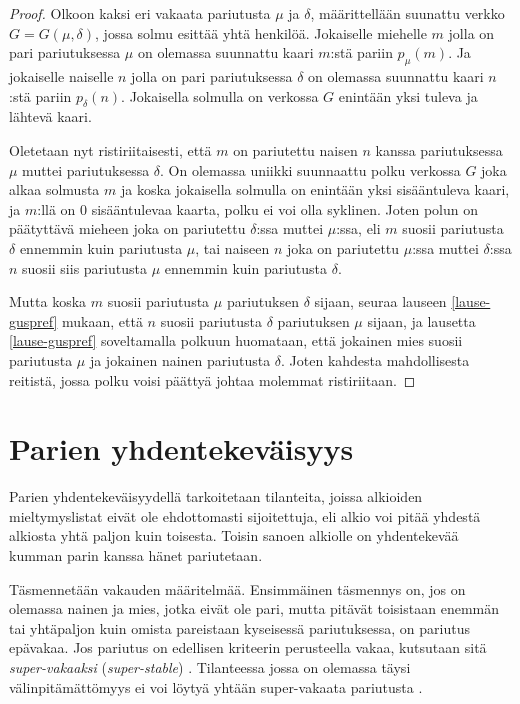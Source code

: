 \documentclass[finnish]{tktltiki2}
\theoremstyle{definition}
\theoremstyle{remark}
\begin{document}
\begin{proof}\cite[p. 27]{gusfield1989stable}
Olkoon kaksi eri vakaata pariutusta $\mu$ ja $\delta$, määrittellään suunattu verkko $G = G(\mu, \delta)$, jossa solmu esittää yhtä henkilöä. Jokaiselle miehelle $m$ jolla on pari pariutuksessa $\mu$ on olemassa suunnattu kaari $m$:stä pariin $p_{\mu}(m)$. Ja jokaiselle naiselle $n$ jolla on pari pariutuksessa $\delta$ on olemassa suunnattu kaari $n$:stä pariin $p_{\delta}(n)$.
Jokaisella solmulla on verkossa $G$ enintään yksi tuleva ja lähtevä kaari.

Oletetaan nyt ristiriitaisesti, että $m$ on pariutettu naisen $n$ kanssa pariutuksessa $\mu$ muttei pariutuksessa $\delta$. On olemassa uniikki suunnaattu polku verkossa $G$ joka alkaa solmusta $m$ ja koska jokaisella solmulla on enintään yksi sisääntuleva kaari, ja $m$:llä on 0 sisääntulevaa kaarta, polku ei voi olla syklinen. Joten polun on päätyttävä mieheen joka on pariutettu $\delta$:ssa muttei $\mu$:ssa, eli $m$ suosii pariutusta $\delta$ ennemmin kuin pariutusta $\mu$, tai naiseen $n$ joka on pariutettu $\mu$:ssa muttei $\delta$:ssa $n$ suosii siis pariutusta $\mu$ ennemmin kuin pariutusta $\delta$.

Mutta koska $m$ suosii pariutusta $\mu$ pariutuksen $\delta$ sijaan, seuraa lauseen \ref{lause-guspref} mukaan, että $n$ suosii pariutusta $\delta$ pariutuksen $\mu$ sijaan, ja lausetta \ref{lause-guspref} soveltamalla polkuun huomataan, että jokainen mies suosii pariutusta $\mu$ ja jokainen nainen pariutusta $\delta$. Joten kahdesta mahdollisesta reitistä, jossa polku voisi päättyä johtaa molemmat ristiriitaan.
\end{proof}

\section{Parien yhdentekeväisyys}
Parien yhdentekeväisyydellä tarkoitetaan tilanteita, joissa alkioiden mieltymyslistat eivät ole ehdottomasti sijoitettuja, eli alkio voi pitää yhdestä alkiosta yhtä paljon kuin toisesta. Toisin sanoen alkiolle on yhdentekevää kumman parin kanssa hänet pariutetaan.

Täsmennetään vakauden määritelmää. Ensimmäinen täsmennys on, jos on olemassa nainen ja mies, jotka eivät ole pari, mutta pitävät toisistaan enemmän tai yhtäpaljon kuin omista pareistaan kyseisessä pariutuksessa, on pariutus epävakaa. Jos pariutus on edellisen kriteerin perusteella vakaa, kutsutaan sitä \emph{super-vakaaksi} (\emph{super-stable}) \cite{gusfield1989stable}. Tilanteessa jossa on olemassa täysi välinpitämättömyys ei voi löytyä yhtään super-vakaata pariutusta \cite[s. 29]{gusfield1989stable}.
\end{document}
